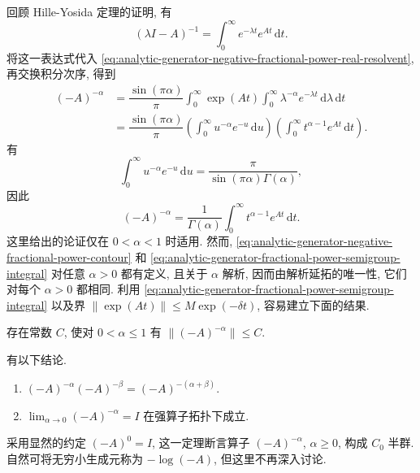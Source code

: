 回顾 Hille-Yosida 定理的证明, 有
\begin{equation}\label{eq:fractional-power-resolvent-laplace-formula}
(\lambda I-A)^{-1}=\int_0^\infty e^{-\lambda t}e^{At}\,\mathrm{d}t.
\end{equation}
将这一表达式代入 \eqref{eq:analytic-generator-negative-fractional-power-real-resolvent}, 再交换积分次序, 得到\[\begin{aligned}
(-A)^{-\alpha}&=\dfrac{\sin(\pi\alpha)}{\pi}\int_0^\infty\exp(At)\int_0^\infty\lambda^{-\alpha}e^{-\lambda t}\,\mathrm{d}\lambda\,\mathrm{d}t\\
&=\dfrac{\sin(\pi\alpha)}{\pi}\left(\int_0^\infty u^{-\alpha}e^{-u}\,\mathrm{d}u\right)\left(\int_0^\infty t^{\alpha-1}e^{At}\,\mathrm{d}t\right).
\end{aligned}\]有
\begin{equation}\label{eq:fractional-power-gamma-reflection-integral}
\int_0^\infty u^{-\alpha}e^{-u}\,\mathrm{d}u=\dfrac{\pi}{\sin(\pi\alpha)\Gamma(\alpha)},
\end{equation}
因此
\begin{equation}\label{eq:analytic-generator-fractional-power-semigroup-integral}
(-A)^{-\alpha}=\dfrac{1}{\Gamma(\alpha)}\int_0^\infty t^{\alpha-1}e^{At}\,\mathrm{d}t.
\end{equation}
这里给出的论证仅在 $0<\alpha<1$ 时适用. 然而, \eqref{eq:analytic-generator-negative-fractional-power-contour} 和 \eqref{eq:analytic-generator-fractional-power-semigroup-integral} 对任意 $\alpha>0$ 都有定义, 且关于 $\alpha$ 解析, 因而由解析延拓的唯一性, 它们对每个 $\alpha>0$ 都相同. 利用 \eqref{eq:analytic-generator-fractional-power-semigroup-integral} 以及界 $\|\exp(At)\|\leq M\exp(-\delta t)$, 容易建立下面的结果.

\begin{Lemma}
\label{lem:negative-fractional-power-uniform-bound}
存在常数 $C$, 使对 $0<\alpha\leq1$ 有 $\|(-A)^{-\alpha}\|\leq C$.
\end{Lemma}

\begin{Theorem}
\label{thm:negative-fractional-powers-semigroup}
有以下结论.\begin{enumerate}\item $(-A)^{-\alpha}(-A)^{-\beta}=(-A)^{-(\alpha+\beta)}$.\item $\lim_{\alpha\to0}(-A)^{-\alpha}=I$ 在强算子拓扑下成立.\end{enumerate}
\end{Theorem}

采用显然的约定 $(-A)^0=I$, 这一定理断言算子 $(-A)^{-\alpha}$, $\alpha\geq0$, 构成 $C_0$ 半群. 自然可将无穷小生成元称为 $-\log(-A)$, 但这里不再深入讨论.

